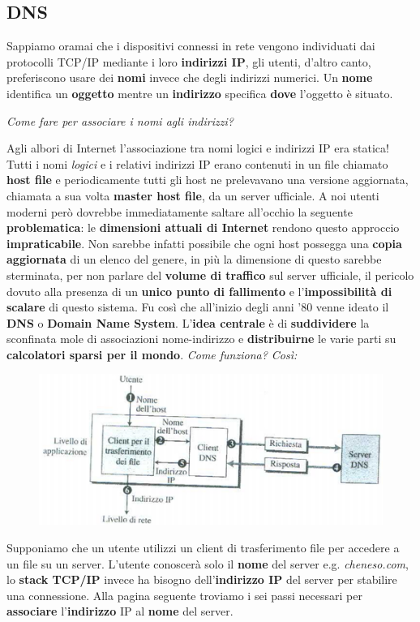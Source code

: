 \documentclass[11pt,a4paper,oneside]{book}
\theoremstyle{definition}
\begin{document}
\subsection{DNS}
Sappiamo oramai che i dispositivi connessi in rete vengono individuati dai protocolli TCP/IP mediante i loro \textbf{indirizzi IP}, gli utenti, d'altro canto, preferiscono usare dei \textbf{nomi} invece che degli indirizzi numerici. Un \textbf{nome} identifica un \textbf{oggetto} mentre un \textbf{indirizzo} specifica \textbf{dove} l'oggetto è situato.
\begin{flushleft}
	\textit{Come fare per associare i nomi agli indirizzi?}
\end{flushleft}
Agli albori di Internet l’associazione tra nomi logici e indirizzi IP era statica!
Tutti i nomi \textit{logici} e i relativi indirizzi IP erano contenuti in un file chiamato \textbf{host file} e periodicamente tutti gli host ne prelevavano una versione aggiornata, chiamata a sua volta \textbf{master host file}, da un server ufficiale.\newline
A noi utenti moderni però dovrebbe immediatamente saltare all'occhio la seguente \textbf{problematica}: le \textbf{dimensioni attuali di Internet} rendono questo approccio \textbf{impraticabile}. Non sarebbe infatti possibile che ogni host possegga una \textbf{copia aggiornata} di un elenco del genere, in più la dimensione di questo  sarebbe sterminata, per non parlare del \textbf{volume di traffico} sul server ufficiale, il pericolo dovuto alla presenza di un \textbf{unico punto di fallimento} e l'\textbf{impossibilità di scalare} di questo sistema.\newline
Fu così che all'inizio degli anni '80 venne ideato il \textbf{DNS} o \textbf{Domain Name System}. L'\textbf{idea centrale} è di \textbf{suddividere} la sconfinata mole di associazioni nome-indirizzo e \textbf{distribuirne} le varie parti su \textbf{calcolatori sparsi per il mondo}. \textit{Come funziona? Così:}
\begin{figure}[!h]
	\includegraphics[scale=0.8]{Immagini/DNS.png}
	\centering
\end{figure}\newline
Supponiamo che un utente utilizzi un client di trasferimento file per accedere a un file su un server. L'utente conoscerà solo il \textbf{nome} del server e.g. \textit{cheneso.com}, lo \textbf{stack TCP/IP} invece ha bisogno dell'\textbf{indirizzo IP} del server per stabilire una connessione. Alla pagina seguente troviamo i sei passi necessari per \textbf{associare} l'\textbf{indirizzo} IP al \textbf{nome} del server.
\end{document}
